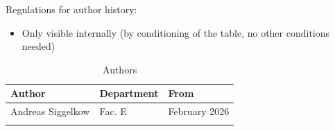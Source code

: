 Regulations for author history:
\begin{itemize}
  \item Only visible internally (by conditioning of the table, no other conditions needed)
\end{itemize}

\begin{table}[H]
\caption{Authors}
\label{tab:qspiauth01a}
\centering
\begin{tabularx}{\textwidth}{|X |X |X |}
  \hline
  Author & Department & From \\
  \hline
  \hline
  Andreas Siggelkow & Fac. E & February 2026 \\
  \hline
  && \\
  \hline
\end{tabularx}
\end{table}
